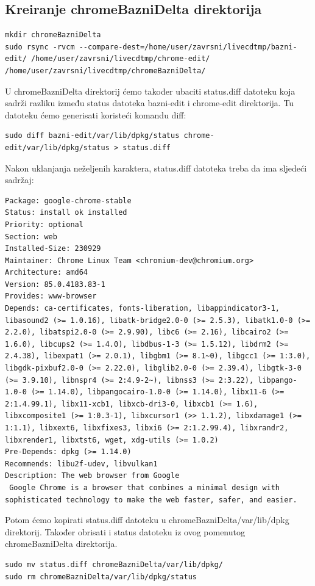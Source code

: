 \documentclass[12pt,vi]{mitthesis}
\begin{document}
\subsection*{Kreiranje chromeBazniDelta direktorija}
\begin{lstlisting}[style=BashInputStyle]
mkdir chromeBazniDelta
sudo rsync -rvcm --compare-dest=/home/user/zavrsni/livecdtmp/bazni-edit/ /home/user/zavrsni/livecdtmp/chrome-edit/ /home/user/zavrsni/livecdtmp/chromeBazniDelta/
\end{lstlisting}
\indent
U chromeBazniDelta direktorij ćemo također ubaciti status.diff datoteku koja sadrži razliku između status datoteka bazni-edit i chrome-edit direktorija. Tu datoteku ćemo generisati koristeći komandu diff:
\begin{lstlisting}[style=BashInputStyle]
sudo diff bazni-edit/var/lib/dpkg/status chrome-edit/var/lib/dpkg/status > status.diff
\end{lstlisting}
Nakon uklanjanja neželjenih karaktera, status.diff datoteka treba da ima sljedeći sadržaj:
\begin{lstlisting}[style=BashInputStyle]
Package: google-chrome-stable
Status: install ok installed
Priority: optional
Section: web
Installed-Size: 230929
Maintainer: Chrome Linux Team <chromium-dev@chromium.org>
Architecture: amd64
Version: 85.0.4183.83-1
Provides: www-browser
Depends: ca-certificates, fonts-liberation, libappindicator3-1, libasound2 (>= 1.0.16), libatk-bridge2.0-0 (>= 2.5.3), libatk1.0-0 (>= 2.2.0), libatspi2.0-0 (>= 2.9.90), libc6 (>= 2.16), libcairo2 (>= 1.6.0), libcups2 (>= 1.4.0), libdbus-1-3 (>= 1.5.12), libdrm2 (>= 2.4.38), libexpat1 (>= 2.0.1), libgbm1 (>= 8.1~0), libgcc1 (>= 1:3.0), libgdk-pixbuf2.0-0 (>= 2.22.0), libglib2.0-0 (>= 2.39.4), libgtk-3-0 (>= 3.9.10), libnspr4 (>= 2:4.9-2~), libnss3 (>= 2:3.22), libpango-1.0-0 (>= 1.14.0), libpangocairo-1.0-0 (>= 1.14.0), libx11-6 (>= 2:1.4.99.1), libx11-xcb1, libxcb-dri3-0, libxcb1 (>= 1.6), libxcomposite1 (>= 1:0.3-1), libxcursor1 (>> 1.1.2), libxdamage1 (>= 1:1.1), libxext6, libxfixes3, libxi6 (>= 2:1.2.99.4), libxrandr2, libxrender1, libxtst6, wget, xdg-utils (>= 1.0.2)
Pre-Depends: dpkg (>= 1.14.0)
Recommends: libu2f-udev, libvulkan1
Description: The web browser from Google
 Google Chrome is a browser that combines a minimal design with sophisticated technology to make the web faster, safer, and easier.
\end{lstlisting}

Potom ćemo kopirati status.diff datoteku u chromeBazniDelta/var/lib/dpkg direktorij. Također obrisati i status datoteku iz ovog pomenutog chromeBazniDelta direktorija.\\
\begin{lstlisting}[style=BashInputStyle]
sudo mv status.diff chromeBazniDelta/var/lib/dpkg/
sudo rm chromeBazniDelta/var/lib/dpkg/status
\end{lstlisting}
\end{document}
